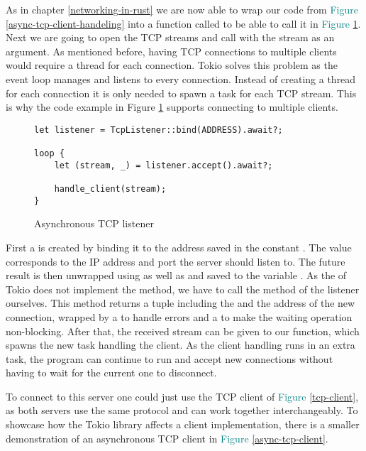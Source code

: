 As in chapter \ref{networking-in-rust} we are now able to wrap our code from
\textcolor{teal}{Figure \ref{async-tcp-client-handeling}} into a function called  to be able to
call it in \textcolor{teal}{Figure \ref{async-tcp-listener}}. Next we are going to open the TCP streams and call
 with the stream as an argument. As mentioned before, having TCP connections to multiple clients
would require a thread for each connection. Tokio solves this problem as the event loop manages and listens to every
connection. Instead of creating a thread for each connection it is only needed to spawn a task for each TCP stream.
This is why the code example in Figure \textcolor{teal}{\ref{async-tcp-listener}} supports connecting to multiple
clients.

\begin{figure}[ht]
    \begin{verbatim}
let listener = TcpListener::bind(ADDRESS).await?;

loop {
    let (stream, _) = listener.accept().await?;

    handle_client(stream);
}
    \end{verbatim}
    \caption{Asynchronous TCP listener}
    \label{async-tcp-listener}
\end{figure}

First a  is created by binding it to the address saved in the  constant
. The value corresponds to the IP address and port the server should listen to. The future result is
then unwrapped using  as well as  and saved to the variable . As the
 of Tokio does not implement the  method, we have to call the  method of
the listener ourselves. This method returns a tuple including the  and the address of the new
connection, wrapped by a  to handle errors and a  to make the waiting operation non-blocking.
After that, the received stream can be given to our  function, which spawns the new task handling
the client. As the client handling runs in an extra task, the program can continue to run and accept new connections
without having to wait for the current one to disconnect.

To connect to this server one could just use the TCP client of \textcolor{teal}{Figure \ref{tcp-client}}, as both
servers use the same protocol and can work together interchangeably. To showcase how the Tokio library affects a client
implementation, there is a smaller demonstration of an asynchronous TCP client in
\textcolor{teal}{Figure \ref{async-tcp-client}}.

